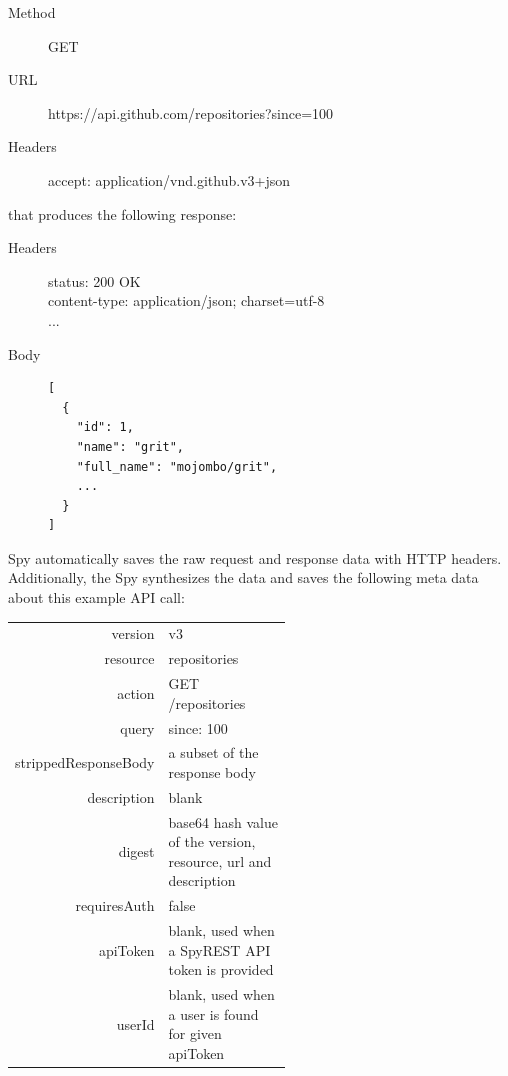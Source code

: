 \documentclass[conference]{IEEEtran}
\begin{document}
\footnotesize
\begin{description}
  \item[Method] GET
  \item[URL] https://api.github.com/repositories?since=100
  \item[Headers] accept: application/vnd.github.v3+json
\end{description}
\normalsize
that produces the following response:
\footnotesize
\begin{description}
  \item[Headers] status: 200 OK \\
content-type: application/json; charset=utf-8 \\
...
  \item[Body]
\begin{lstlisting}
[
  {
    "id": 1,
    "name": "grit",
    "full_name": "mojombo/grit",
    ...
  }
]\end{lstlisting}
\end{description}
\normalsize
Spy automatically saves the raw request and response data with HTTP headers. Additionally, the Spy synthesizes the data and saves the following meta data about this example API call:

\footnotesize
\begin{tabular}{r p{0.55\linewidth}}
  version & v3 \\
  resource & repositories \\
  action & GET /repositories \\
  query & since: 100 \\
  strippedResponseBody & a subset of the response body \\
  description & blank \\
  digest & base64 hash value of the version, resource, url and description \\
  requiresAuth & false \\
  apiToken & blank, used when a SpyREST API token is provided \\
  userId & blank, used when a user is found for given apiToken \\
\end{tabular}
\normalsize
\end{document}
